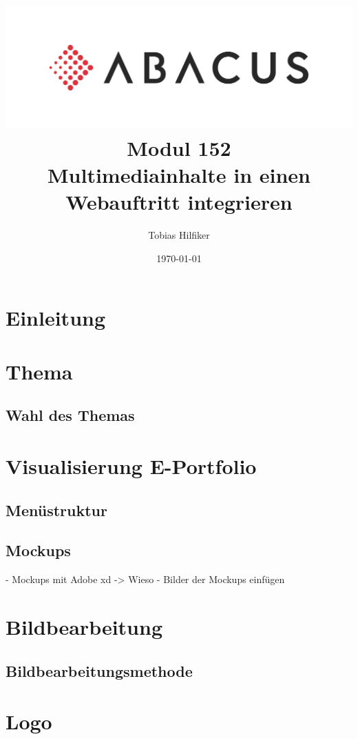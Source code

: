 \documentclass[11pt]{article}
\title{
    \includegraphics{media/frontpage.jpg}
    Modul 152 \\
    Multimediainhalte in einen Webauftritt integrieren}
\author{Tobias Hilfiker}
\date{\today}
\begin{document}
    \maketitle
    \pagebreak

    \tableofcontents
    \pagebreak

    \section{Einleitung}

    \section{Thema}

    \subsection{Wahl des Themas}

    \section{Visualisierung E-Portfolio}

    \subsection{Menüstruktur}

    \subsection{Mockups}
    - Mockups mit Adobe xd -> Wieso
    - Bilder der Mockups einfügen

    \section{Bildbearbeitung}

    \subsection{Bildbearbeitungsmethode}

    \section{Logo}
\end{document}
